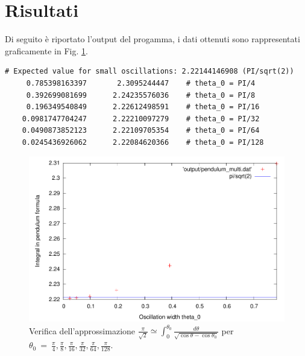 \documentclass[a4paper]{article}
\begin{document}
\section{Risultati}
Di seguito è riportato l'output del progamma, i dati ottenuti sono
rappresentati graficamente in Fig. \ref{fig:plot}.
\begin{lstlisting}
# Expected value for small oscillations: 2.22144146908 (PI/sqrt(2))
     0.785398163397       2.3095244447    # theta_0 = PI/4
     0.392699081699      2.24235576036    # theta_0 = PI/8
     0.196349540849      2.22612498591    # theta_0 = PI/16
    0.0981747704247      2.22210097279    # theta_0 = PI/32
    0.0490873852123      2.22109705354    # theta_0 = PI/64
    0.0245436926062      2.22084620366    # theta_0 = PI/128
\end{lstlisting}
\begin{center}
  \begin{figure}

    \begin{center}
      \includegraphics[width=130mm]{plot.pdf}
    \end{center}

    \caption{ Verifica dell'approssimazione $ \frac{\pi}{\sqrt{2}} \simeq \int_{0}^{\theta_0}\frac{d\theta}{\sqrt{\cos{\theta}-\cos{\theta_0}}} $ per $ \theta_0~=~\frac{\pi}{4}, \frac{\pi}{8}, \frac{\pi}{16}, \frac{\pi}{32}, \frac{\pi}{64}, \frac{\pi}{128} $.  }
    
    \label{fig:plot}
    
  \end{figure}
\end{center}
\end{document}
